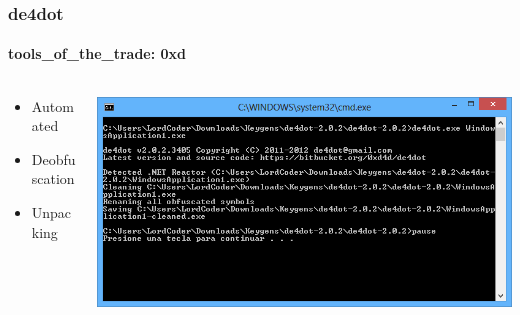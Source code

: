 \documentclass[aspectratio=169]{beamer}
\begin{document}
\begin{frame}
  \frametitle{de4dot}
  \framesubtitle{tools\_of\_the\_trade: 0xd}
  \begin{columns}
    \begin{column}{.3\textwidth}
      \begin{itemize}
      \item{Automated}
      \item{Deobfuscation}
      \item{Unpacking}
      \end{itemize}
    \end{column}
    \hfill
    \begin{column}{.7\textwidth}
      \includegraphics[scale=.55]{de4dot}
    \end{column}
  \end{columns}
\end{frame}
\end{document}

